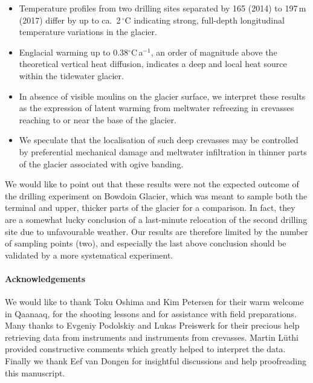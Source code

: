 \documentclass[utf8]{article}
\begin{document}
    \begin{itemize}

      \item Temperature profiles from two drilling sites separated by 165
        (2014) to 197\,m (2017) differ by up to ca.~2\,$^\circ$C indicating
        strong, full-depth longitudinal temperature variations in the glacier.

      \item Englacial warming up to 0.38$^\circ$C\,a$^{-1}$, an order of
        magnitude above the theoretical vertical heat diffusion, indicates a
        deep and local heat source within the tidewater glacier.

      \item In absence of visible moulins on the glacier surface, we interpret
        these results as the expression of latent warming from meltwater
        refreezing in crevasses reaching to or near the base of the glacier.

      \item We speculate that the localisation of such deep crevasses may be
        controlled by preferential mechanical damage and meltwater infiltration
        in thinner parts of the glacier associated with ogive banding.

    \end{itemize}

    We would like to point out that these results were not the expected outcome
    of the drilling experiment on Bowdoin Glacier, which was meant to sample
    both the terminal and upper, thicker parts of the glacier for a comparison.
    In fact, they are a somewhat lucky conclusion of a last-minute relocation
    of the second drilling site due to unfavourable weather. Our results are
    therefore limited by the number of sampling points (two), and especially
    the last above conclusion should be validated by a more systematical
    experiment.



\paragraph{Acknowledgements}

    We would like to thank Toku Oshima and Kim Petersen for their warm welcome
    in Qaanaaq, for the shooting lessons and for assistance with field
    preparations. Many thanks to Evgeniy Podolskiy and Lukas Preiswerk for
    their precious help retrieving data from instruments and instruments from
    crevasses. Martin Lüthi provided constructive comments which greatly helped
    to interpret the data. Finally we thank Eef van Dongen for insightful
    discussions and help proofreading this manuscript.
\end{document}
